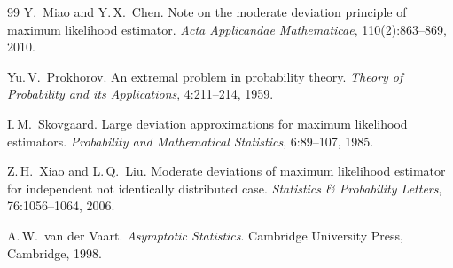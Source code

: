 \documentclass[11pt,a4paper]{article}
\begin{document}
\begin{thebibliography}{99}
Y.~Miao and Y.\,X.~Chen.
Note on the moderate deviation principle of maximum likelihood estimator.
\textit{Acta Applicandae Mathematicae}, 110(2):863--869, 2010.

Yu.\,V.~Prokhorov.
An extremal problem in probability theory.
\textit{Theory of Probability and its Applications}, 4:211--214, 1959.

I.\,M.~Skovgaard.
Large deviation approximations for maximum likelihood estimators.
\textit{Probability and Mathematical Statistics}, 6:89--107, 1985.

Z.\,H.~Xiao and L.\,Q.~Liu.
Moderate deviations of maximum likelihood estimator for independent not identically distributed case.
\textit{Statistics \& Probability Letters}, 76:1056--1064, 2006.

A.\,W.~van der Vaart.
\textit{Asymptotic Statistics}.
Cambridge University Press, Cambridge, 1998.

\end{thebibliography}
\end{document}
